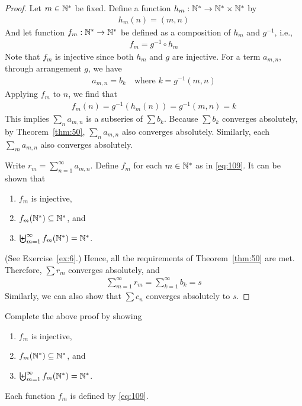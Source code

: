 \documentclass[thmcnt=section, 12pt]{my-elegantbook}
\begin{document}
\begin{proof}
    Let $m \in \mathbb{N}^\ast$ be fixed. Define a function $h_m: \mathbb{N}^\ast \to \mathbb{N}^\ast \times \mathbb{N}^\ast$ by 
    \begin{align*}
        h_m(n) = (m, n)
    \end{align*}
    And let function $f_m: \mathbb{N}^\ast \to \mathbb{N}^\ast$ be defined as a composition of $h_m$ and $g^{-1}$, i.e.,
    \begin{align}
        f_m = g^{-1} \circ h_m
        \label{eq:109}
    \end{align}
    Note that $f_m$ is injective since both $h_m$ and $g$ are injective. For a term $a_{m,n}$, through arrangement $g$, we have 
    \begin{align*}
        a_{m,n} = b_k
        \quad \text{where $k = g^{-1}(m,n)$}
    \end{align*}
    Applying $f_m$ to $n$, we find that 
    \begin{align*}
        f_m(n) = g^{-1}( h_m(n) )
        = g^{-1}(m, n)
        = k
    \end{align*}
    This implies $\sum_n a_{m,n}$ is a subseries of $\sum b_k$. Because $\sum b_k$ converges absolutely, by Theorem~\ref{thm:50}, $\sum_n a_{m,n}$ also converges absolutely. Similarly, each $\sum_m a_{m,n}$ also converges absolutely.

    Write $r_m = \sum_{n=1}^\infty a_{m,n}$. Define $f_m$ for each $m \in \mathbb{N}^\ast$ as in \eqref{eq:109}. It can be shown that 
    \begin{enumerate}
        \item $f_m$ is injective,
        \item $f_m(\mathbb{N}^\ast) \subseteq \mathbb{N}^\ast$, and 
        \item $\biguplus_{m=1}^\infty f_m(\mathbb{N}^\ast) = \mathbb{N}^\ast$.
    \end{enumerate}
    (See Exercise~\ref{ex:6}.) Hence, all the requirements of Theorem~\ref{thm:50} are met. Therefore, $\sum r_m$ converges absolutely, and 
    \begin{align*}
        \sum_{m=1}^\infty r_m 
        = \sum_{k=1}^\infty b_k 
        = s
    \end{align*}
    Similarly, we can also show that $\sum c_n$ converges absolutely to $s$.
\end{proof}

\begin{exercise}
    Complete the above proof by showing 
    \begin{enumerate}
        \item $f_m$ is injective,
        \item $f_m(\mathbb{N}^\ast) \subseteq \mathbb{N}^\ast$, and 
        \item $\biguplus_{m=1}^\infty f_m(\mathbb{N}^\ast) = \mathbb{N}^\ast$.
    \end{enumerate}
    Each function $f_m$ is defined by \eqref{eq:109}.
    \label{ex:6}
\end{exercise}
\end{document}
